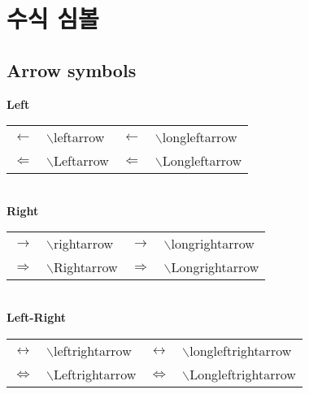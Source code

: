 		
\newpage
\chapter{수식 심볼}
	
		\minitoc		
		

%
%
%
\clearpage
\section{Arrow symbols}

			\textbf{Left}\\
			\begin{tabular}{ p{} p{} 
							p{} p{}  }
			\toprule
			$\leftarrow$		&$\backslash$leftarrow &
			$\longleftarrow$	&$\backslash$longleftarrow \\
			$\Leftarrow$		&$\backslash$Leftarrow&
			$\Longleftarrow$	&$\backslash$Longleftarrow \\
			\bottomrule
			\end{tabular} \\
			
			\textbf{Right}\\
			\begin{tabular}{ p{} p{} 
							p{} p{}  }
			\toprule
			$\rightarrow $		&$\backslash$rightarrow& 
			$\longrightarrow$	&$\backslash$longrightarrow \\
			$\Rightarrow$		&$\backslash$Rightarrow&
			$\Longrightarrow$	&$\backslash$Longrightarrow \\
			\bottomrule
			\end{tabular} \\
		
			\textbf{Left-Right}\\
			\begin{tabular}{ p{} p{} 
							p{} p{}  }
			\toprule
			$\leftrightarrow $		&$\backslash$leftrightarrow& 
			$\longleftrightarrow$	&$\backslash$longleftrightarrow \\
			$\Leftrightarrow$		&$\backslash$Leftrightarrow&
			$\Longleftrightarrow$	&$\backslash$Longleftrightarrow \\
			\bottomrule
			\end{tabular} \\

